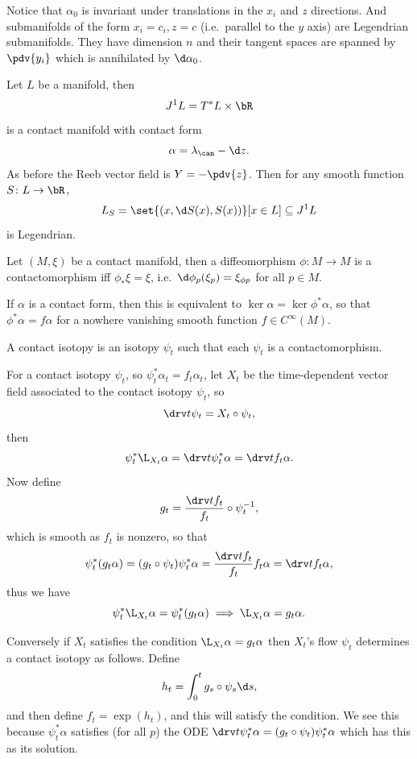     Notice that $\alpha_0$ is invariant under translations in the $x_i$ and $z$ directions.
    And submanifolds of the form $x_i=c_i,z=c$ (i.e.\ parallel to the $y$ axis) are Legendrian submanifolds.
    They have dimension $n$ and their tangent spaces are spanned by $\pdv{y_i}$ which is annihilated by
    $\d\alpha_0$.

\eexam

\bexam

    Let $L$ be a manifold, then
    $$ J^1L = T^*L\times\bR $$
    is a contact manifold with contact form
    $$ \alpha = \lambda_\can - \d z . $$
    As before the Reeb vector field is $Y=-\pdv{z}$.
    Then for any smooth function $S\colon L\to\bR$,
    $$ L_S = \set{(x,\d S(x),S(x))}[x\in L] \subseteq J^1L $$
    is Legendrian.

\eexam

\bdefn

    Let $(M,\xi)$ be a contact manifold, then a diffeomorphism $\phi\colon M\to M$ is a
    {\emphcolor contactomorphism} iff $\phi_*\xi=\xi$, i.e.\ $\d\phi_p(\xi_p)=\xi_{\phi p}$ for all
    $p\in M$.

\edefn

If $\alpha$ is a contact form, then this is equivalent to $\ker\alpha=\ker\phi^*\alpha$, so that
$\phi^*\alpha=f\alpha$ for a nowhere vanishing smooth function $f\in C^\infty(M)$.

\bdefn

    A {\emphcolor contact isotopy} is an isotopy $\psi_t$ such that each $\psi_t$ is a contactomorphism.

\edefn

For a contact isotopy $\psi_t$, so $\psi_t^*\alpha_t=f_t\alpha_t$, let $X_t$ be the time-dependent vector
field associated to the contact isotopy $\psi_t$, so
$$ \drv t\psi_t = X_t\circ\psi_t, $$
then
$$ \psi_t^*\L_{X_t}\alpha = \drv t\psi_t^*\alpha = \drv tf_t\alpha . $$
Now define
$$ g_t = \frac{\drv tf_t}{f_t}\circ\psi_t^{-1} , $$
which is smooth as $f_t$ is nonzero, so that
$$ \psi_t^*(g_t\alpha) = (g_t\circ\psi_t)\psi_t^*\alpha = \frac{\drv tf_t}{f_t}f_t\alpha = \drv tf_t\alpha , $$
thus we have
$$ \psi_t^*\L_{X_t}\alpha = \psi_t^*(g_t\alpha) \implies \L_{X_t}\alpha = g_t\alpha . $$

Conversely if $X_t$ satisfies the condition $\L_{X_t}\alpha=g_t\alpha$ then $X_t$'s flow $\psi_t$ determines
a contact isotopy as follows.
Define
$$ h_t = \int_0^t g_s\circ\psi_s\d s , $$
and then define $f_t=\exp(h_t)$, and this will satisfy the condition.
We see this because $\psi_t^*\alpha$ satisfies (for all $p$) the ODE
$\drv t\psi_t^*\alpha=(g_t\circ\psi_t)\psi_t^*\alpha$ which has this as its solution.


